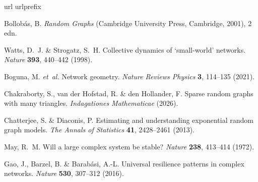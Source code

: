 \documentclass[a4paper,12pt]{article}
\begin{document}
\begin{thebibliography}{10}
\expandafter\ifx\csname url\endcsname\relax
  \def\url#1{\texttt{#1}}\fi
\expandafter\ifx\csname urlprefix\endcsname\relax\def\urlprefix{URL }\fi
\providecommand{\bibinfo}[2]{#2}
\providecommand{\eprint}[2][]{\url{#2}}

\bibinfo{author}{Bollob{\'a}s, B.}
\newblock \emph{\bibinfo{title}{Random Graphs}} (\bibinfo{publisher}{Cambridge
  University Press}, \bibinfo{address}{Cambridge}, \bibinfo{year}{2001}),
  \bibinfo{edition}{2} edn.

\bibinfo{author}{Watts, D.~J.} \& \bibinfo{author}{Strogatz, S.~H.}
\newblock \bibinfo{title}{Collective dynamics of ‘small-world’ networks}.
\newblock \emph{\bibinfo{journal}{Nature}} \textbf{\bibinfo{volume}{393}},
  \bibinfo{pages}{440--442} (\bibinfo{year}{1998}).

\bibinfo{author}{Boguna, M.} \emph{et~al.}
\newblock \bibinfo{title}{Network geometry}.
\newblock \emph{\bibinfo{journal}{Nature Reviews Physics}}
  \textbf{\bibinfo{volume}{3}}, \bibinfo{pages}{114--135}
  (\bibinfo{year}{2021}).

\bibinfo{author}{Chakraborty, S.}, \bibinfo{author}{{van der Hofstad}, R.} \&
  \bibinfo{author}{{den Hollander}, F.}
\newblock \bibinfo{title}{Sparse random graphs with many triangles}.
\newblock \emph{\bibinfo{journal}{Indagationes Mathematicae}}
  (\bibinfo{year}{2026}).

\bibinfo{author}{Chatterjee, S.} \& \bibinfo{author}{Diaconis, P.}
\newblock \bibinfo{title}{Estimating and understanding exponential random graph
  models}.
\newblock \emph{\bibinfo{journal}{The Annals of Statistics}}
  \textbf{\bibinfo{volume}{41}}, \bibinfo{pages}{2428--2461}
  (\bibinfo{year}{2013}).

\bibinfo{author}{May, R.~M.}
\newblock \bibinfo{title}{Will a large complex system be stable?}
\newblock \emph{\bibinfo{journal}{Nature}} \textbf{\bibinfo{volume}{238}},
  \bibinfo{pages}{413--414} (\bibinfo{year}{1972}).

\bibinfo{author}{Gao, J.}, \bibinfo{author}{Barzel, B.} \&
  \bibinfo{author}{Barab{\'a}si, A.-L.}
\newblock \bibinfo{title}{Universal resilience patterns in complex networks}.
\newblock \emph{\bibinfo{journal}{Nature}} \textbf{\bibinfo{volume}{530}},
  \bibinfo{pages}{307--312} (\bibinfo{year}{2016}).


\end{thebibliography}
\end{document}
